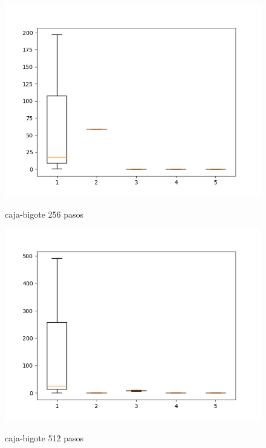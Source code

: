 \documentclass[a4paper, 11pt]{article}
\begin{document}
\begin{figure}[H]
      \centering                      %
      \caption{caja-bigote 256 pasos}
      \includegraphics[scale=.7]{256_pasos.png}   
      \label{cb256}
\end{figure}

\begin{figure}[H]
      \centering 
      \caption{caja-bigote 512 pasos} 
      \includegraphics[scale=.7]{512_pasos.png}   
      \label{cb512}
\end{figure}

\bigskip
\bigskip
\bigskip
\bigskip
\bigskip
\bigskip
\bigskip


\end{document}
